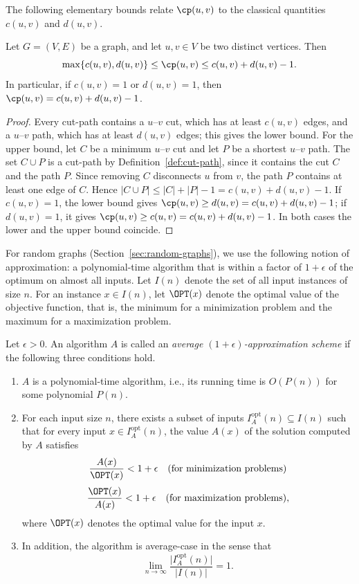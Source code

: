 The following elementary bounds relate $\cp(u, v)$ to the classical quantities $c(u, v)$ and $d(u, v)$.

\begin{lemma}
\label{lem:basic-bounds}
Let $G = (V, E)$ be a graph, and let $u, v \in V$ be two distinct vertices. Then
\[
\max\{c(u, v), d(u, v)\} \leq \cp(u, v) \leq c(u, v) + d(u, v) - 1.
\]
In particular, if $c(u, v) = 1$ or $d(u, v) = 1$, then $\cp(u, v) = c(u, v) + d(u, v) - 1$.
\end{lemma}

\begin{proof}
Every cut-path contains a $u$--$v$ cut, which has at least $c(u, v)$ edges, and a $u$--$v$ path, which has at least $d(u, v)$ edges; this gives the lower bound.
For the upper bound, let $C$ be a minimum $u$--$v$ cut and let $P$ be a shortest $u$--$v$ path.
The set $C \cup P$ is a cut-path by Definition~\ref{def:cut-path}, since it contains the cut $C$ and the path $P$.
Since removing $C$ disconnects $u$ from $v$, the path $P$ contains at least one edge of $C$.
Hence $|C \cup P| \leq |C| + |P| - 1 = c(u, v) + d(u, v) - 1$.
If $c(u, v) = 1$, the lower bound gives $\cp(u, v) \geq d(u, v) = c(u, v) + d(u, v) - 1$; if $d(u, v) = 1$, it gives $\cp(u, v) \geq c(u, v) = c(u, v) + d(u, v) - 1$.
In both cases the lower and the upper bound coincide.
\end{proof}

For random graphs (Section~\ref{sec:random-graphs}), we use the following notion of approximation: a polynomial-time algorithm that is within a factor of $1+\epsilon$ of the optimum on almost all inputs.
Let $I(n)$ denote the set of all input instances of size $n$.
For an instance $x \in I(n)$, let $\OPT(x)$ denote the optimal value of the objective function, that is, the minimum for a minimization problem and the maximum for a maximization problem.

\begin{definition}
\label{def:approximation-scheme}
Let $\epsilon > 0$. An algorithm $A$ is called an \emph{average $(1+\epsilon)$-approximation scheme} if the following three conditions hold.
\begin{enumerate}
    \item $A$ is a polynomial-time algorithm, i.e., its running time is $O(P(n))$ for some polynomial $P(n)$.
    \item For each input size $n$, there exists a subset of inputs $I_{A}^{\mathrm{opt}}(n) \subseteq I(n)$ such that for every input $x \in I_{A}^{\mathrm{opt}}(n)$, the value $A(x)$ of the solution computed by $A$ satisfies
    \[
    \frac{A(x)}{\OPT(x)} < 1+\epsilon \quad \text{(for minimization problems)}
    \]
    \[
    \frac{\OPT(x)}{A(x)} < 1+\epsilon \quad \text{(for maximization problems)},
    \]
    where $\OPT(x)$ denotes the optimal value for the input $x$.
    \item In addition, the algorithm is average-case in the sense that
    \[
    \lim_{n \to \infty} \frac{\lvert I_{A}^{\mathrm{opt}}(n) \rvert}{\lvert I(n) \rvert} = 1.
    \]
\end{enumerate}
\end{definition}

